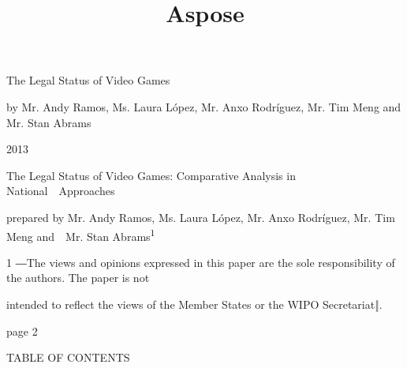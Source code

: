 \documentclass[
]{article}
\title{Aspose}
\author{}
\date{}
\begin{document}
\maketitle

\protect\hypertarget{out.xhtml}{}{}

{The Legal Status of Video Games}

{by Mr. Andy Ramos, Ms. Laura López, Mr. Anxo Rodríguez, Mr. Tim Meng
and Mr. Stan Abrams}

{2013}

{The Legal Status of Video Games: Comparative Analysis in
National~~Approaches}

{prepared by Mr. Andy Ramos, Ms. Laura López, Mr. Anxo Rodríguez, Mr.
Tim Meng and~~Mr. Stan Abrams}\textsuperscript{{1}}

{1 }{―The views and opinions expressed in this paper are the sole
}{responsibility of the authors. The paper is not}

{intended to reflect the views of the Member States or the WIPO
Secretariat‖.}

{page 2}

{TABLE OF CONTENTS}
\end{document}
